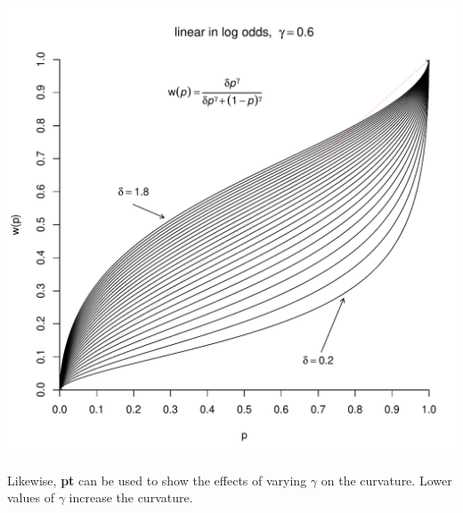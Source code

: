 \documentclass{article}\usepackage[]{graphicx}\usepackage[]{color}
\makeatletter
\def\maxwidth{ %
  \ifdim\Gin@nat@width>\linewidth
    \linewidth
  \else
    \Gin@nat@width
  \fi
}
\newenvironment{knitrout}{}{} %
\makeatother
\begin{document}
\begin{knitrout}
{\centering \includegraphics[width=\maxwidth]{figure/unnamed-chunk-22} 

}



\end{knitrout}


Likewise, {\bf pt} can be used to show the effects of varying $\gamma$ on the curvature. Lower values of $\gamma$ increase the curvature.
\end{document}
